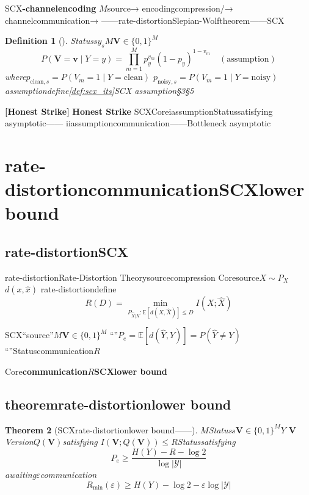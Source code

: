 \documentclass[11pt,a4paper]{article}
\newtheorem{theorem}{Theorem}[section]
\newtheorem{definition}[theorem]{Definition}
\theoremstyle{remark}
\newcommand{\Y}{\mathcal{Y}}
\newcommand{\E}{\mathbb{E}}
\newcommand{\honeststrike}{\textnormal{\textbf{[Honest Strike]}}}
\begin{document}
SCX\textbf{-channelencoding}
$M$source→ encodingcompression/→ channelcommunication→ 
——rate-distortionSlepian-Wolftheorem——SCX

\begin{definition}[]
\label{def:joint_vote}
Status$s$$y_s$$M$$\mathbf{V} \in \{0,1\}^M$
\begin{equation}
    P(\mathbf{V} = \mathbf{v} \mid Y = y)
    = \prod_{m=1}^{M} p_{y}^{v_m} (1 - p_{y})^{1 - v_m}
    \quad (\text{assumption})
\end{equation}
where$p_{\text{clean}, s} = P(V_m = 1 \mid Y = \text{clean})$
$p_{\text{noisy}, s} = P(V_m = 1 \mid Y = \text{noisy})$\\
\textbf{}assumptiondefine\ref{def:scx_its}SCX
\textbf{}assumption\S3\S5
\end{definition}

\honeststrike{} \textbf{Honest Strike}
SCXCoreiassumptionStatussatisfying
asymptotic——\textbf{}
iiassumptioncommunication——Bottleneck
asymptotic

\section{rate-distortioncommunicationSCXlower bound}

\subsection{rate-distortionSCX}

rate-distortionRate-Distortion Theorysourcecompression
Core\cite{cover2006}source$X \sim P_X$$d(x, \hat{x})$
rate-distortiondefine
\begin{equation}
    R(D) = \min_{P_{\hat{X}|X}: \E[d(X, \hat{X})] \leq D} I(X; \hat{X})
\end{equation}

SCX``source''$M$$\mathbf{V} \in \{0,1\}^M$
``''$P_e = \E[d(\hat{Y}, Y)] = P(\hat{Y} \neq Y)$
``''Statuscommunication$R$

Core\textbf{communication$R$SCXlower bound}

\subsection{theoremrate-distortionlower bound}

\begin{theorem}[SCXrate-distortionlower bound——]
\label{thm:rdt_audit}
$M$Status$s$$\mathbf{V} \in \{0,1\}^M$$Y$
$\mathbf{V}$Version$Q(\mathbf{V})$satisfying
$I(\mathbf{V}; Q(\mathbf{V})) \leq R$Statussatisfying
\begin{equation}
    \boxed{P_e \geq \frac{H(Y) - R - \log 2}{\log |\Y|}}
\end{equation}
awaiting$\varepsilon$communication
\begin{equation}
    \boxed{R_{\min}(\varepsilon) \geq H(Y) - \log 2 - \varepsilon \log |\Y|}
\end{equation}
\end{theorem}
\end{document}
